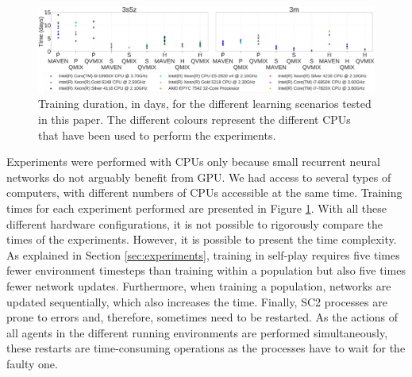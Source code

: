 \begin{figure}[ht]
    \centering
    \includegraphics[width=\textwidth]{tex_thesis/figures/ch7/training_time.pdf}
    \caption{Training duration, in days, for the different learning scenarios tested in this paper.
    The different colours represent the different CPUs that have been used to perform the experiments.}
    \label{fig:training_time}
\end{figure}

Experiments were performed with CPUs only because small recurrent neural networks do not arguably benefit from GPU.
We had access to several types of computers, with different numbers of CPUs accessible at the same time.
Training times for each experiment performed are presented in Figure \ref{fig:training_time}.
With all these different hardware configurations, it is not possible to rigorously compare the times of the experiments.
However, it is possible to present the time complexity.
As explained in Section \ref{sec:experiments}, training in self-play requires five times fewer environment timesteps than training within a population but also five times fewer network updates.
Furthermore, when training a population, networks are updated sequentially, which also increases the time.
Finally, SC2 processes are prone to errors and, therefore, sometimes need to be restarted.
As the actions of all agents in the different running environments are performed simultaneously, these restarts are time-consuming operations as the processes have to wait for the faulty one.
